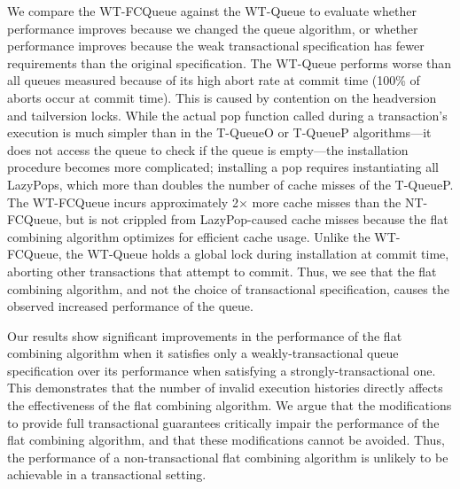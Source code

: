 We compare the WT-FCQueue against the WT-Queue to evaluate whether performance improves because we changed the queue algorithm, or whether performance improves because the weak transactional specification has fewer requirements than the original specification. The WT-Queue performs worse than all queues measured because of its high abort rate at commit time (100\% of aborts occur at commit time). This is caused by contention on the headversion and tailversion locks. While the actual pop function called during a transaction's execution is much simpler than in the T-QueueO or T-QueueP algorithms---it does not access the queue to check if the queue is empty---the installation procedure becomes more complicated; installing a pop requires instantiating all LazyPops, which more than doubles the number of cache misses of the T-QueueP. The WT-FCQueue incurs approximately 2$\times$ more cache misses than the NT-FCQueue, but is not crippled from LazyPop-caused cache misses because the flat combining algorithm optimizes for efficient cache usage. Unlike the WT-FCQueue, the WT-Queue holds a global lock during installation at commit time, aborting other transactions that attempt to commit. Thus, we see that the flat combining algorithm, and not the choice of transactional specification, causes the observed increased performance of the queue.

Our results show significant improvements in the performance of the flat combining algorithm when it satisfies only a weakly-transactional queue specification over its performance when satisfying a strongly-transactional one. This demonstrates that the number of invalid execution histories directly affects the effectiveness of the flat combining algorithm. We argue that the modifications to provide full transactional guarantees critically impair the performance of the flat combining algorithm, and that these modifications cannot be avoided. Thus, the performance of a non-transactional flat combining algorithm is unlikely to be achievable in a transactional setting.
